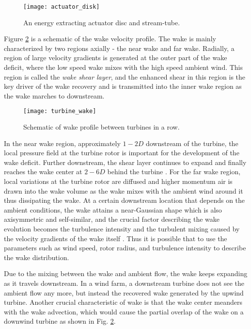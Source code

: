 \documentclass{umthesis}
\begin{document}
\begin{figure}
  \centering
  \texttt{[image: actuator\_disk]}
  \caption{An energy extracting actuator disc and stream-tube.}\label{fig:actuator_disk}
\end{figure}

Figure \ref{fig:wake} is a schematic of the wake velocity profile. The wake is mainly characterized by two regions axially - the near wake and far wake. Radially, a region of large velocity gradients is generated at the outer part of the wake deficit, where the low speed wake mixes with the high speed ambient wind. This region is called the \textit{wake shear layer}, and the enhanced shear in this region is the key driver of the wake recovery and is transmitted into the inner wake region as the wake marches to downstream.

\begin{figure}
  \centering
  \texttt{[image: turbine\_wake]}
  \caption{Schematic of wake profile between turbines in a row.}\label{fig:wake}
\end{figure}


In the near wake region, approximately $1-2D$ downstream of the turbine, the local pressure field at the turbine rotor is important for the development of the wake deficit. Further downstream, the shear layer continues to expand and finally reaches the wake center at $2-6D$ behind the turbine \cite{Aerodynamics}. For the far wake region, local variations at the turbine rotor are diffused and higher momentum air is drawn into the wake volume as the wake mixes with the ambient wind around it thus dissipating the wake. At a certain downstream location that depends on the ambient conditions, the wake attains a near-Gaussian shape which is also axisymmetric and self-similar, and the crucial factor describing the wake evolution becomes the turbulence intensity and the turbulent mixing caused by the velocity gradients of the wake itself \cite{Meteorological_controls}. Thus it is possible that to use the parameters such as wind speed, rotor radius, and turbulence intensity to describe the wake distribution.

Due to the mixing between the wake and ambient flow, the wake keeps expanding as it travels downstream. In a wind farm, a downstream turbine does not see the ambient flow any more, but instead the recovered wake generated by the upwind turbine. Another crucial characteristic of wake is that the wake center meanders with the wake advection, which would cause the partial overlap of the wake on a downwind turbine as shown in Fig. \ref{fig:wake}.
\end{document}
